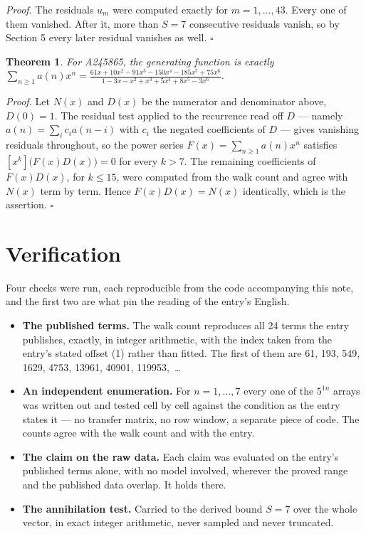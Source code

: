 \documentclass[11pt]{article}
\newtheorem{theorem}{Theorem}
\theoremstyle{definition}
\begin{document}
{\itshape Proof.} The residuals $u_m$ were computed exactly for $m = 1,\dots,43$. Every one of them vanished. After it, more than $S = 7$ consecutive residuals vanish, so by Section 5 every later residual vanishes as well. $\square$

\begin{theorem} For A245865, the generating function is exactly $\sum_{n\ge 1} a(n)x^n = \frac{61x + 10x^{2} - 91x^{3} - 150x^{4} - 185x^{5} + 75x^{6}}{1 - 3x - x^{2} + x^{3} + 5x^{4} + 8x^{5} - 3x^{6}}$.\end{theorem}

{\itshape Proof.} Let $N(x)$ and $D(x)$ be the numerator and denominator above, $D(0)=1$. The residual test applied to the recurrence read off $D$ --- namely $a(n) = \sum_i c_i a(n-i)$ with $c_i$ the negated coefficients of $D$ --- gives vanishing residuals throughout, so the power series $F(x)=\sum_{n\ge 1}a(n)x^n$ satisfies $[x^k]\bigl(F(x)D(x)\bigr) = 0$ for every $k > 7$. The remaining coefficients of $F(x)D(x)$, for $k \le 15$, were computed from the walk count and agree with $N(x)$ term by term. Hence $F(x)D(x) = N(x)$ identically, which is the assertion. $\square$

\section{Verification}

Four checks were run, each reproducible from the code accompanying this note, and the first two are what pin the reading of the entry's English.

\begin{itemize}

\item {\bfseries The published terms.} The walk count reproduces all 24 terms the entry publishes, exactly, in integer arithmetic, with the index taken from the entry's stated offset (1) rather than fitted. The first of them are 61, 193, 549, 1629, 4753, 13961, 40901, 119953,~\dots

\item {\bfseries An independent enumeration.} For $n = 1,\dots,7$ every one of the $5^{1n}$ arrays was written out and tested cell by cell against the condition as the entry states it --- no transfer matrix, no row window, a separate piece of code. The counts agree with the walk count and with the entry.

\item {\bfseries The claim on the raw data.} Each claim was evaluated on the entry's published terms alone, with no model involved, wherever the proved range and the published data overlap. It holds there.

\item {\bfseries The annihilation test.} Carried to the derived bound $S = 7$ over the whole vector, in exact integer arithmetic, never sampled and never truncated.

\end{itemize}
\end{document}
